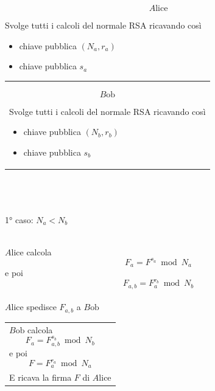 \documentclass[a4paper,12pt, oneside]{book}
\begin{document}
\begin{minipage}{0.45\textwidth}

	$$A\mbox{lice}$$\linebreak[2]

	Svolge tutti i calcoli del normale RSA ricavando così
	\begin{itemize}
		\item chiave pubblica $(N_a, r_a)$
		\item chiave pubblica $s_a$
	\end{itemize}

\end{minipage}%
\hfill
\begin{minipage}{0.45\textwidth}
	\begin{tabular}{|p{\textwidth}}

		$$B\mbox{ob}$$\linebreak[2]

		Svolge tutti i calcoli del normale RSA ricavando così
		\begin{itemize}
			\item chiave pubblica $(N_b, r_b)$
			\item chiave pubblica $s_b$
		\end{itemize}
	\end{tabular}
\end{minipage}\\\\\\%

1° caso: $N_a < N_b$\\\\
\begin{minipage}{0.45\textwidth}
	$A\mbox{lice}$ calcola
	$$F_a = F^{s_a} \bmod N_a$$
	e poi
	$$F_{a,b} = F_{a}^{r_{b}} \bmod N_{b}$$\\
	$A\mbox{lice}$ spedisce $F_{a,b}$ a $B\mbox{ob}$
\end{minipage}%
\hfill
\begin{minipage}{0.45\textwidth}
	\begin{tabular}{|p{\textwidth}}
		$B\mbox{ob}$ calcola
		$$F_{a} = F_{a,b}^{s_{b}} \bmod N_{b}$$
		e poi
		$$F = F_a^{r_a} \bmod N_a$$ \\
		E ricava la firma $F$ di $A\mbox{lice}$
	\end{tabular}
\end{minipage}\\\\\\%
\end{document}
